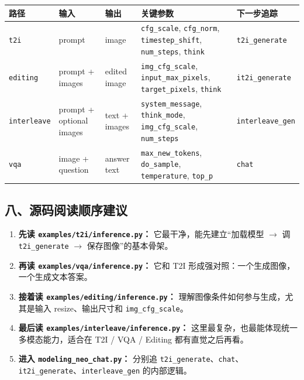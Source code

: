 \begin{center}
{\small
\begin{tabular}{p{2.6cm}p{3.0cm}p{3.4cm}p{3.8cm}p{2.4cm}}
\hline
\textbf{路径} & \textbf{输入} & \textbf{输出} & \textbf{关键参数} & \textbf{下一步追踪} \\
\hline
\texttt{t2i} & prompt & image & \texttt{cfg\_scale}, \texttt{cfg\_norm}, \texttt{timestep\_shift}, \texttt{num\_steps}, \texttt{think} & \texttt{t2i\_generate} \\
\texttt{editing} & prompt + images & edited image & \texttt{img\_cfg\_scale}, \texttt{input\_max\_pixels}, \texttt{target\_pixels}, \texttt{think} & \texttt{it2i\_generate} \\
\texttt{interleave} & prompt + optional images & text + images & \texttt{system\_message}, \texttt{think\_mode}, \texttt{img\_cfg\_scale}, \texttt{num\_steps} & \texttt{interleave\_gen} \\
\texttt{vqa} & image + question & answer text & \texttt{max\_new\_tokens}, \texttt{do\_sample}, \texttt{temperature}, \texttt{top\_p} & \texttt{chat} \\
\hline
\end{tabular}
}
\end{center}

\subsection{八、源码阅读顺序建议}

\begin{enumerate}[leftmargin=1.8em]
  \item \textbf{先读 \texttt{examples/t2i/inference.py}：} 它最干净，能先建立“加载模型 \(\rightarrow\) 调 \texttt{t2i\_generate} \(\rightarrow\) 保存图像”的基本骨架。
  \item \textbf{再读 \texttt{examples/vqa/inference.py}：} 它和 T2I 形成强对照：一个生成图像，一个生成文本答案。
  \item \textbf{接着读 \texttt{examples/editing/inference.py}：} 理解图像条件如何参与生成，尤其是输入 resize、输出尺寸和 \texttt{img\_cfg\_scale}。
  \item \textbf{最后读 \texttt{examples/interleave/inference.py}：} 这里最复杂，也最能体现统一多模态能力，适合在 T2I / VQA / Editing 都有直觉之后再看。
  \item \textbf{进入 \texttt{modeling\_neo\_chat.py}：} 分别追 \texttt{t2i\_generate}、\texttt{chat}、\texttt{it2i\_generate}、\texttt{interleave\_gen} 的内部逻辑。
\end{enumerate}

